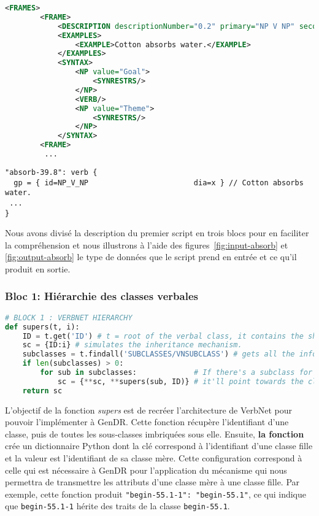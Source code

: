\begin{lstlisting}[language=XML, caption=Input du script: cadres syntaxique imbriqués dans les fichiers VerbNet, label=fig:input-absorb]
<FRAMES>
        <FRAME>
            <DESCRIPTION descriptionNumber="0.2" primary="NP V NP" secondary="Basic Transitive" xtag=""/>
            <EXAMPLES>
                <EXAMPLE>Cotton absorbs water.</EXAMPLE>
            </EXAMPLES>
            <SYNTAX>
                <NP value="Goal">
                    <SYNRESTRS/>
                </NP>
                <VERB/>
                <NP value="Theme">
                    <SYNRESTRS/>
                </NP>
            </SYNTAX>
		<FRAME>
         ...
\end{lstlisting}


\begin{lstlisting}[language=mate, caption=Output du script: propriétés de la classe verbale \texttt{absorb-39.8}, label=fig:output-absorb ]
"absorb-39.8": verb {
  gp = { id=NP_V_NP                        dia=x } // Cotton absorbs water.
 ...
}
\end{lstlisting}

Nous avons divisé la description du premier script en trois blocs pour en faciliter la compréhension et nous illustrons à l'aide des figures~\ref{fig:input-absorb} et \ref{fig:output-absorb} le type de données que le script prend en entrée et ce qu'il produit en sortie.

\subsubsection{Bloc 1: Hiérarchie des classes verbales}

\begin{lstlisting}[language=Python, caption = Importation de l'architecture des classes verbales, label=fig:archivn-bloc1]
# BLOCK 1 : VERBNET HIERARCHY
def supers(t, i):
    ID = t.get('ID') # t = root of the verbal class, it contains the shared syntactic information.
    sc = {ID:i} # simulates the inheritance mechanism.
    subclasses = t.findall('SUBCLASSES/VNSUBCLASS') # gets all the information on the subclasses.
    if len(subclasses) > 0:
        for sub in subclasses:             # If there's a subclass for a given VNCLASS, 
            sc = {**sc, **supers(sub, ID)} # it'll point towards the class it's being dominated by.
    return sc
\end{lstlisting}

L'objectif de la fonction \emph{supers} est de recréer l'architecture de VerbNet pour pouvoir l'implémenter à GenDR. Cette fonction récupère l'identifiant d'une classe, puis de toutes les sous-classes imbriquées sous elle. Ensuite, \textbf{la fonction} crée un dictionnaire Python dont la clé correspond à l'identifiant d'une classe fille et la valeur est l'identifiant de sa classe mère. Cette configuration correspond à celle qui est nécessaire à GenDR pour l'application du mécanisme qui nous permettra de transmettre les attributs d'une classe mère à une classe fille. Par exemple, cette fonction produit \lstinline|"begin-55.1-1": "begin-55.1"|, ce qui indique que \texttt{begin-55.1-1} hérite des traits de la classe \texttt{begin-55.1}.

